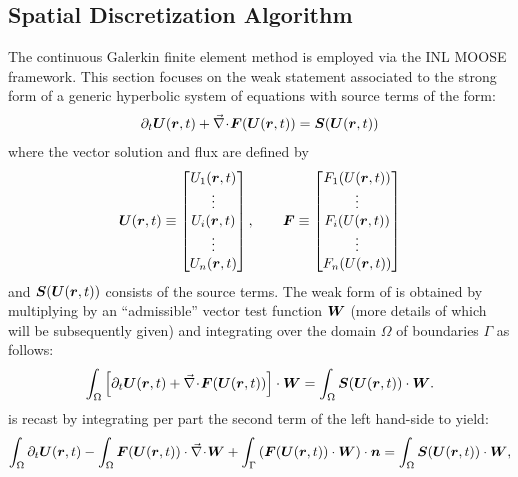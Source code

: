\subsection{Spatial Discretization Algorithm\label{sec:spatial_discretization}}
%
The continuous Galerkin finite element method is employed
via the INL MOOSE framework.  This section focuses on
the weak statement associated to the strong form of a generic hyperbolic system of equations with source terms of the form:
\begin{align}
  \label{eqn:va_system_notation}
\partial_t \boldsymbol U(\boldsymbol r, t) + \vec{\nabla}\! \cdot \! \boldsymbol F(\boldsymbol U(\boldsymbol r, t)) = \boldsymbol S(\boldsymbol U(\boldsymbol r, t))
\end{align}
where the vector solution and flux are defined by
\begin{align}
  \boldsymbol U(\boldsymbol r, t) \equiv
  \begin{bmatrix}
    U_1(\boldsymbol r, t)
    \\
    \vdots
    \\
    U_i(\boldsymbol r, t)
    \\
   \vdots
    \\
   U_n(\boldsymbol r, t)
  \end{bmatrix},
  \qquad
  \boldsymbol F \equiv
  \begin{bmatrix}
    F_1(U(\boldsymbol r, t))
    \\
    \vdots
    \\
    F_i(U(\boldsymbol r, t))
    \\
    \vdots
    \\
    F_n(U(\boldsymbol r, t))
  \end{bmatrix}
\end{align}
and $  \boldsymbol S(\boldsymbol U(\boldsymbol r, t))$ consists of the source
terms. 
%
The weak form of  is obtained by multiplying
by an ``admissible'' vector test function
$\boldsymbol W$ (more details of which will be subsequently given) and
integrating over the domain $\Omega$ of boundaries $\Gamma$ as follows:
\begin{align}
  \label{en:va_system_weak}
  \int_{\Omega} \left[ \partial_t \boldsymbol U(\boldsymbol r, t) + \vec{\nabla}\! \cdot \! \boldsymbol F(\boldsymbol U(\boldsymbol r, t))\right] \cdot \boldsymbol W 
  =  \int_{\Omega}  \boldsymbol S(\boldsymbol U(\boldsymbol r, t)) \cdot \boldsymbol W.
\end{align}
 is recast by integrating per part the second term of the left hand-side to yield:
\begin{align}
  \label{en:va_system_weak2}
  \int_\Omega \partial_t \boldsymbol U(\boldsymbol r, t) -   \int_\Omega \boldsymbol F(\boldsymbol U(\boldsymbol r, t)) \cdot \vec{\nabla}\! \cdot \! \boldsymbol W 
+ \int_\Gamma \left( \boldsymbol F(\boldsymbol U(\boldsymbol r, t)) \cdot \boldsymbol W \right) \cdot \boldsymbol n   =  \int_{\Omega}  \boldsymbol S(\boldsymbol U(\boldsymbol r, t)) \cdot \boldsymbol W,
\end{align}
